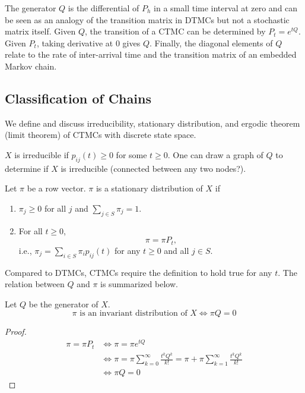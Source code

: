 \documentclass[11pt,twoside]{article}
\begin{document}
\begin{remark}
    The generator $Q$ is the differential of $P_h$ in a small time interval at zero and can be seen as an analogy of the transition matrix in DTMCs but not a stochastic matrix itself. Given $Q$, the transition of a CTMC can be determined by $P_t=e^{tQ}$. Given $P_t$, taking derivative at 0 gives $Q$. Finally, the diagonal elements of $Q$ relate to the rate of inter-arrival time and the transition matrix of an embedded Markov chain.   
\end{remark}

\subsection{Classification of Chains}
We define and discuss irreducibility, stationary distribution, and ergodic theorem (limit theorem) of CTMCs with discrete state space.

\begin{definition}[Irreducibility]
    $X$ is irreducible if $p_{ij}(t) \geq 0$ for some $t \geq 0$. One can draw a graph of $Q$ to determine if $X$ is irreducible (connected between any two nodes?).
\end{definition}

\begin{definition}
    Let $\pi$ be a row vector. $\pi$ is a stationary distribution of $X$ if
    \begin{enumerate}
        \item $\pi_j \geq 0$ for all $j$ and $\sum_{j \in S}\pi_j=1$.
        \item For all $t \geq 0$,
        \[
        \pi = \pi P_t,
        \]
        i.e., $\pi_j = \sum_{i \in S}\pi_i p_{ij}(t)$ for any $t \geq 0$ and all $j \in S$.
    \end{enumerate}
\end{definition}

Compared to DTMCs, CTMCs require the definition to hold true for any $t$. The relation between $Q$ and $\pi$ is summarized below.

\begin{theorem} Let $Q$ be the generator of $X$.
    \[
    \pi \text{ is an invariant distribution of } X\Leftrightarrow \pi Q= 0
    \]
\end{theorem}

\begin{proof}
    \begin{align*}
        \pi = \pi P_t &\Leftrightarrow \pi = \pi e^{tQ} \\
        &\Leftrightarrow \pi = \pi \sum_{k=0}^\infty \frac{t^kQ^k}{k!} = \pi  + \pi \sum_{k=1}^\infty \frac{t^kQ^k}{k!}\\
        & \Leftrightarrow \pi Q =0
    \end{align*}
\end{proof}
\end{document}
